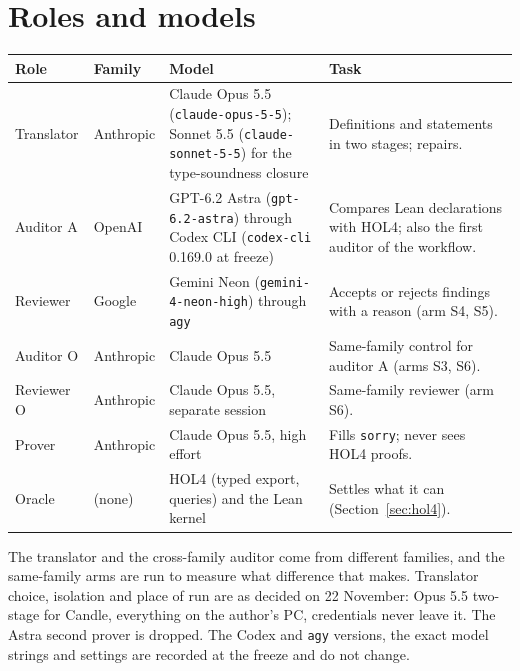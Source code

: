 \documentclass[11pt,a4paper]{article}
\newcommand{\code}[1]{\texttt{#1}}
\begin{document}
\section{Roles and models}
\begin{table}[h]\small
\begin{tabularx}{\textwidth}{@{}lllX@{}}
\toprule
Role & Family & Model & Task\\
\midrule
Translator & Anthropic & Claude Opus 5.5 (\code{claude-opus-5-5}); Sonnet 5.5 (\code{claude-sonnet-5-5}) for the type-soundness closure & Definitions and statements in two stages; repairs.\\
Auditor A & OpenAI & GPT-6.2 Astra (\code{gpt-6.2-astra}) through Codex CLI (\code{codex-cli} 0.169.0 at freeze) & Compares Lean declarations with HOL4; also the first auditor of the workflow.\\
Reviewer & Google & Gemini Neon (\code{gemini-4-neon-high}) through \code{agy} & Accepts or rejects findings with a reason (arm S4, S5).\\
Auditor O & Anthropic & Claude Opus 5.5 & Same-family control for auditor A (arms S3, S6).\\
Reviewer O & Anthropic & Claude Opus 5.5, separate session & Same-family reviewer (arm S6).\\
Prover & Anthropic & Claude Opus 5.5, high effort & Fills \code{sorry}; never sees HOL4 proofs.\\
Oracle & (none) & HOL4 (typed export, queries) and the Lean kernel & Settles what it can (Section~\ref{sec:hol4}).\\
\bottomrule
\end{tabularx}
\end{table}
The translator and the cross-family auditor come from different families, and the same-family arms are run to measure what difference that makes. Translator choice, isolation and place of run are as decided on 22 November: Opus 5.5 two-stage for Candle, everything on the author's PC, credentials never leave it. The Astra second prover is dropped. The Codex and \code{agy} versions, the exact model strings and settings are recorded at the freeze and do not change.
\end{document}
